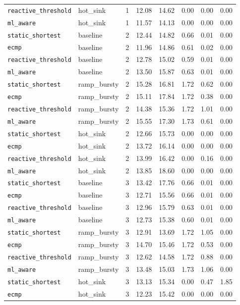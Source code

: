 \begin{longtable}{llcrrrrr}
\texttt{reactive\_threshold} & hot\_sink & 1 & 12.08 & 14.62 & 0.00 & 0.00 & 0.00 \\
\texttt{ml\_aware} & hot\_sink & 1 & 11.57 & 14.13 & 0.00 & 0.00 & 0.00 \\
\midrule
\texttt{static\_shortest} & baseline & 2 & 12.44 & 14.82 & 0.66 & 0.01 & 0.00 \\
\texttt{ecmp} & baseline & 2 & 11.96 & 14.86 & 0.61 & 0.02 & 0.00 \\
\texttt{reactive\_threshold} & baseline & 2 & 12.78 & 15.02 & 0.59 & 0.01 & 0.00 \\
\texttt{ml\_aware} & baseline & 2 & 13.50 & 15.87 & 0.63 & 0.01 & 0.00 \\
\texttt{static\_shortest} & ramp\_bursty & 2 & 15.28 & 16.81 & 1.72 & 0.62 & 0.00 \\
\texttt{ecmp} & ramp\_bursty & 2 & 15.11 & 17.84 & 1.72 & 0.38 & 0.00 \\
\texttt{reactive\_threshold} & ramp\_bursty & 2 & 14.38 & 15.36 & 1.72 & 1.01 & 0.00 \\
\texttt{ml\_aware} & ramp\_bursty & 2 & 15.55 & 17.30 & 1.73 & 0.61 & 0.00 \\
\texttt{static\_shortest} & hot\_sink & 2 & 12.66 & 15.73 & 0.00 & 0.00 & 0.00 \\
\texttt{ecmp} & hot\_sink & 2 & 13.72 & 16.14 & 0.00 & 0.00 & 0.00 \\
\texttt{reactive\_threshold} & hot\_sink & 2 & 13.99 & 16.42 & 0.00 & 0.16 & 0.00 \\
\texttt{ml\_aware} & hot\_sink & 2 & 13.85 & 18.60 & 0.00 & 0.00 & 0.00 \\
\midrule
\texttt{static\_shortest} & baseline & 3 & 13.42 & 17.76 & 0.66 & 0.01 & 0.00 \\
\texttt{ecmp} & baseline & 3 & 12.71 & 15.56 & 0.66 & 0.01 & 0.00 \\
\texttt{reactive\_threshold} & baseline & 3 & 12.96 & 15.79 & 0.63 & 0.01 & 0.00 \\
\texttt{ml\_aware} & baseline & 3 & 12.73 & 15.38 & 0.60 & 0.01 & 0.00 \\
\texttt{static\_shortest} & ramp\_bursty & 3 & 12.91 & 13.69 & 1.72 & 1.05 & 0.00 \\
\texttt{ecmp} & ramp\_bursty & 3 & 14.70 & 15.46 & 1.72 & 0.53 & 0.00 \\
\texttt{reactive\_threshold} & ramp\_bursty & 3 & 12.62 & 14.58 & 1.72 & 0.88 & 0.00 \\
\texttt{ml\_aware} & ramp\_bursty & 3 & 13.48 & 15.03 & 1.73 & 1.06 & 0.00 \\
\texttt{static\_shortest} & hot\_sink & 3 & 13.13 & 15.34 & 0.00 & 0.47 & 1.85 \\
\texttt{ecmp} & hot\_sink & 3 & 12.23 & 15.42 & 0.00 & 0.00 & 0.00 \\
\bottomrule
\end{longtable}
\endgroup

